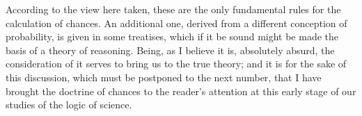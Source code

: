 According to the view here taken, these are the only fundamental rules for the calculation of chances. An additional one, derived from a different conception of probability, is given in some treatises, which if it be sound might be made the basis of a theory of reasoning. Being, as I believe it is, absolutely absurd, the consideration of it serves to bring us to the true theory; and it is for the sake of this discussion, which must be postponed to the next number, that I have brought the doctrine of chances to the reader's attention at this early stage of our studies of the logic of science.

